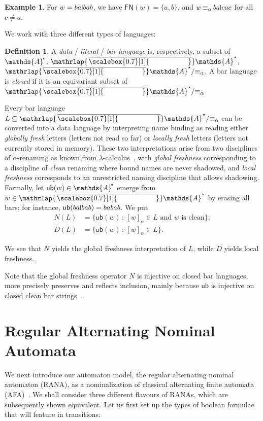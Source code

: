 \documentclass[10pt,a4paper]{amsart}
\theoremstyle{definition}
\newtheorem{defn}[theo]{Definition}
\newtheorem{example}[theo]{Example}
\newcommand{\seq}{\subseteq}
\newcommand{\At}{\mathds{A}}
\newcommand{\Ats}{\At^{\!\raisebox{1pt}{\scriptsize$\star$}}}
\newcommand{\barAs}{\barNames^{\star}}
\newcommand{\names}{\At}
\newcommand{\setw}[2]{\{#1\,:\,#2\}}
\DeclareMathOperator{\alphaequiv}{\equiv_{\alpha}}
\newcommand{\mybar}[3]{%
  \mathrlap{\hspace{#2}\overline{\scalebox{#1}[1]{\phantom{\ensuremath{#3}}}}}\ensuremath{#3}
}
\newcommand{\FN}{\mathsf{FN}}
\newcommand{\barNames}{{\mybar{0.7}{1.25pt}{\names}}}
\newcommand{\ub}{{\mathsf{ub}}}
\newcommand{\midmid}{\hspace{0.2ex}{\rule[-0.1ex]{0.6pt}{1.65ex}}\hspace{0.2ex}}
\newcommand{\newletter}[1]{{\midmid}#1}
\newcommand{\quotient}[2]{#1/{#2}} %
\begin{document}
\begin{example} For $w = ba\newletter{b}ab$, we have $\FN(w)=\{a,b\}$, and $w \alphaequiv ba\newletter{c}ac$ for all $c\neq a$.
\end{example}
 We work with three different types of languages:

\begin{defn} A \emph{data} / \emph{literal} / \emph{bar language} is, respectively, a subset of $\Ats$, $\barAs$, $\quotient{\barAs}{\alphaequiv}$.
    A bar language is \emph{closed} if it is an equivariant subset of $\quotient{\barAs}{\alphaequiv}$. 
\end{defn}
Every bar language $L \seq \barAs/{\alphaequiv}$ can be converted into a data language by interpreting name binding as reading either \emph{globally fresh} letters (letters not read so far) or \emph{locally fresh} letters (letters not currently stored in memory).
These two interpretations arise from two disciplines of $\alpha$-renaming as known from $\lambda$-calculus~\cite{barendregt85}, with \emph{global freshness} corresponding to a discipline of \emph{clean} renaming where bound names are never shadowed, and \emph{local freshness} corresponds to an unrestricted naming discipline that allows shadowing. Formally, let $\ub(w)\in \Ats$ emerge from $w\in \barAs$ by erasing all bars; for instance, $\ub(ba\newletter{b}ab)=babab$. We put
\begin{equation}
  \begin{aligned}
    N(L) & = \setw{\ub(w)}{\text{$[w]_\alpha \in L$ and $w$ is
    clean}}; \\
    D(L) & = \setw{\ub(w)}{[w]_\alpha \in L}.
  \end{aligned}\label{eq:ND}
\end{equation}

We see that $N$ yields the global freshness interpretation of $L$, while $D$ yields local freshness.

Note that the global freshness operator $N$ is injective on closed bar
languages, more precisely preserves and reflects inclusion, mainly
because $\ub$ is injective on closed clean bar
strings~\cite[Lemma~A.3]{skmw17}.


\section{Regular Alternating Nominal Automata}\label{sec:rana}
We next introduce our automaton model, the regular alternating nominal automaton (RANA),
as a nominalization of classical alternating finite automata (AFA)~\cite{cks81}. %
We shall consider three different flavours of RANAs, which are subsequently shown equivalent. 
Let us first set up the types of boolean formulae that will feature in transitions:
\end{document}

